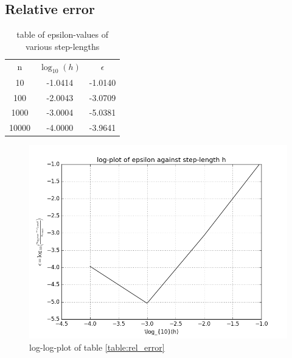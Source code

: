 \documentclass[11pt,a4paper,notitlepage]{article}
\begin{document}
\subsection{Relative error}
	\begin{table}[h!]
	\centering
		\label{table:relerror}
		\begin{tabular}{|c|c|c|} \hline
			n & $\log_{10}(h)$ & $\epsilon$ \\
			10 & -1.0414 & -1.0140 \\
			100 & -2.0043 & -3.0709 \\	
			1000 & -3.0004 & -5.0381 \\
			10000 & -4.0000 & -3.9641 \\ \hline
		\end{tabular}
		\caption{table of epsilon-values of various step-lengths}
	\end{table}
	\begin{figure}[h!]
		\label{fig:relerror}
		\includegraphics[scale=0.7]{../img/epsilon.png}
		\caption{log-log-plot of table \ref{table:rel_error}}
	\end{figure}
	
\end{document}
